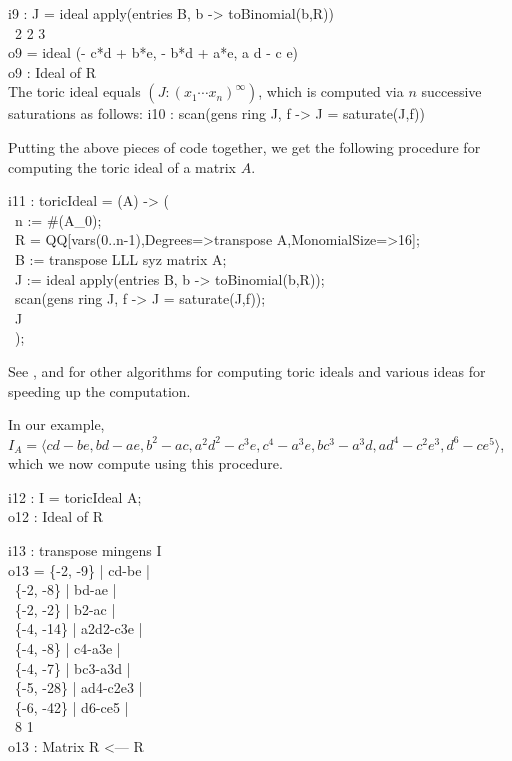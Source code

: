 \beginOutput
i9 : J = ideal apply(entries B, b -> toBinomial(b,R)) \\
\emptyLine
\                                       2 2    3\\
o9 = ideal (- c*d + b*e, - b*d + a*e, a d  - c e)\\
\emptyLine
o9 : Ideal of R\\
\endOutput
The toric ideal equals $(J : (x_1 \cdots x_n)^\infty)$, which is 
computed via $n$ successive saturations as follows:
\beginOutput
i10 : scan(gens ring J, f -> J = saturate(J,f))\\
\endOutput

Putting the above pieces of code together, we get the following
procedure for computing the toric ideal of a matrix $A$.

\beginOutput
i11 : toricIdeal = (A) -> (\\
\          n := #(A_0);  \\
\          R = QQ[vars(0..n-1),Degrees=>transpose A,MonomialSize=>16]; \\
\          B := transpose LLL syz matrix A;\\
\          J := ideal apply(entries B, b -> toBinomial(b,R));\\
\          scan(gens ring J, f -> J = saturate(J,f));\\
\          J\\
\          ); \\
\endOutput

See \cite{HS:BLR}, \cite{HS:HS} and \cite[\S 4, \S 12]{HS:St2} for other
algorithms for computing toric ideals and various ideas for
speeding up the computation.

In our example, $I_A = \langle
cd-be,bd-ae,b^2-ac,a^2d^2-c^3e,c^4-a^3e,bc^3-a^3d,
ad^4-c^2e^3,d^6-ce^5 \rangle$, which we now compute using this
procedure.  

\beginOutput
i12 : I = toricIdeal A; \\
\emptyLine
o12 : Ideal of R\\
\endOutput
 
\beginOutput
i13 : transpose mingens I\\
\emptyLine
o13 = \{-2, -9\}  | cd-be    |\\
\      \{-2, -8\}  | bd-ae    |\\
\      \{-2, -2\}  | b2-ac    |\\
\      \{-4, -14\} | a2d2-c3e |\\
\      \{-4, -8\}  | c4-a3e   |\\
\      \{-4, -7\}  | bc3-a3d  |\\
\      \{-5, -28\} | ad4-c2e3 |\\
\      \{-6, -42\} | d6-ce5   |\\
\emptyLine
\              8       1\\
o13 : Matrix R  <--- R\\
\endOutput

